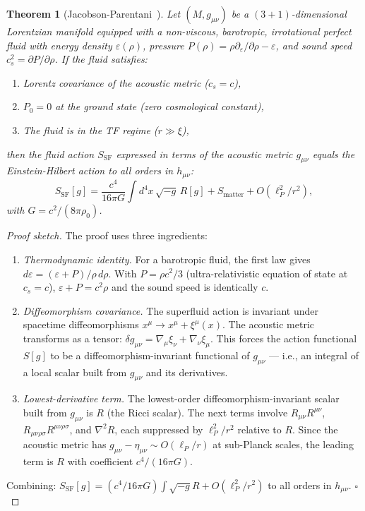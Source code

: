 \documentclass[11pt,a4paper]{article}
\theoremstyle{bctthm}
\newtheorem{theorem}{Theorem}
\theoremstyle{definition}
\begin{document}
\begin{theorem}[Jacobson-Parentani~\cite{jacobson1995,parentani2007}]
\label{thm:JP}
Let $(M, g_{\mu\nu})$ be a $(3+1)$-dimensional Lorentzian manifold equipped
with a non-viscous, barotropic, irrotational perfect fluid with energy density
$\varepsilon(\rho)$, pressure $P(\rho) = \rho\partial_\varepsilon/\partial\rho - \varepsilon$,
and sound speed $c_s^2 = \partial P/\partial\rho$.
If the fluid satisfies:
\begin{enumerate}[label=(\roman*)]
\item Lorentz covariance of the acoustic metric ($c_s = c$),
\item $P_0 = 0$ at the ground state (zero cosmological constant),
\item The fluid is in the TF regime ($r \gg \xi$),
\end{enumerate}
then the fluid action $S_\mathrm{SF}$ expressed in terms of the acoustic metric
$g_{\mu\nu}$ equals the Einstein-Hilbert action to all orders in $h_{\mu\nu}$:
\begin{equation}
S_\mathrm{SF}[g] = \frac{c^4}{16\pi G}\int d^4x\,\sqrt{-g}\,R[g]
+ S_\mathrm{matter} + O(\ell_P^2/r^2),
\label{eq:JP}
\end{equation}
with $G = c^2/(8\pi\rho_0)$.
\end{theorem}

\begin{proof}[Proof sketch]
The proof uses three ingredients:
\begin{enumerate}
\item \emph{Thermodynamic identity.} For a barotropic fluid, the first law gives
$d\varepsilon = (\varepsilon + P)/\rho\,d\rho$. With $P = \rho c^2/3$
(ultra-relativistic equation of state at $c_s=c$), $\varepsilon + P = c^2\rho$
and the sound speed is identically $c$.
\item \emph{Diffeomorphism covariance.} The superfluid action is invariant
under spacetime diffeomorphisms $x^\mu \to x^\mu + \xi^\mu(x)$.
The acoustic metric transforms as a tensor: $\delta g_{\mu\nu} = \nabla_\mu\xi_\nu
+ \nabla_\nu\xi_\mu$.
This forces the action functional $S[g]$ to be a diffeomorphism-invariant
functional of $g_{\mu\nu}$ — i.e., an integral of a local scalar built from
$g_{\mu\nu}$ and its derivatives.
\item \emph{Lowest-derivative term.} The lowest-order diffeomorphism-invariant
scalar built from $g_{\mu\nu}$ is $R$ (the Ricci scalar). The next terms
involve $R_{\mu\nu}R^{\mu\nu}$, $R_{\mu\nu\rho\sigma}R^{\mu\nu\rho\sigma}$,
and $\nabla^2 R$, each suppressed by $\ell_P^2/r^2$ relative to $R$.
Since the acoustic metric has $g_{\mu\nu} - \eta_{\mu\nu} \sim O(\ell_P/r)$
at sub-Planck scales, the leading term is $R$ with coefficient $c^4/(16\pi G)$.
\end{enumerate}
Combining: $S_\mathrm{SF}[g] = (c^4/16\pi G)\int\sqrt{-g}R + O(\ell_P^2/r^2)$
to all orders in $h_{\mu\nu}$. $\square$
\end{proof}
\end{document}
